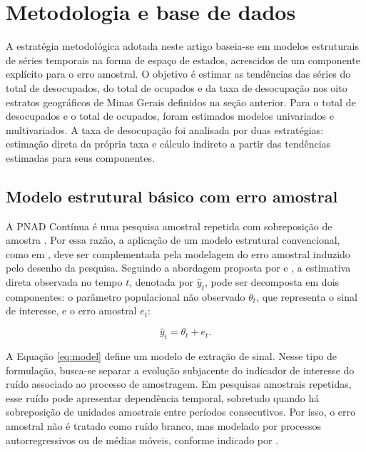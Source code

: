 \documentclass[rbe,wwwview]{econbr}
\begin{document}
\section{Metodologia e base de dados}
\label{sec:metodologia}

A estratégia metodológica adotada neste artigo baseia-se em modelos estruturais de séries temporais na forma de espaço de estados, acrescidos de um componente explícito para o erro amostral. O objetivo é estimar as tendências das séries do total de desocupados, do total de ocupados e da taxa de desocupação nos oito estratos geográficos de Minas Gerais definidos na seção anterior. Para o total de desocupados e o total de ocupados, foram estimados modelos univariados e multivariados. A taxa de desocupação foi analisada por duas estratégias: estimação direta da própria taxa e cálculo indireto a partir das tendências estimadas para seus componentes.
\subsection{Modelo estrutural básico com erro amostral}
\label{subsec:meb}

A PNAD Contínua é uma pesquisa amostral repetida com sobreposição de amostra \citep{pnadNT}. Por essa razão, a aplicação de um modelo estrutural convencional, como em \citet{harvey1989}, deve ser complementada pela modelagem do erro amostral induzido pelo desenho da pesquisa. Seguindo a abordagem proposta por \citet{scott1974} e \citet{scott1977}, a estimativa direta observada no tempo \(t\), denotada por \(\hat{y}_t\), pode ser decomposta em dois componentes: o parâmetro populacional não observado \(\theta_t\), que representa o sinal de interesse, e o erro amostral \(e_t\):

\vspace{-0.5cm}
\begin{equation}
    \hat{y}_t = \theta_t + e_t.
    \label{eq:model}
\end{equation}

A Equação \ref{eq:model} define um modelo de extração de sinal. Nesse tipo de formulação, busca-se separar a evolução subjacente do indicador de interesse do ruído associado ao processo de amostragem. Em pesquisas amostrais repetidas, esse ruído pode apresentar dependência temporal, sobretudo quando há sobreposição de unidades amostrais entre períodos consecutivos. Por isso, o erro amostral não é tratado como ruído branco, mas modelado por processos autorregressivos ou de médias móveis, conforme indicado por \citet{scott1977}.
\end{document}
